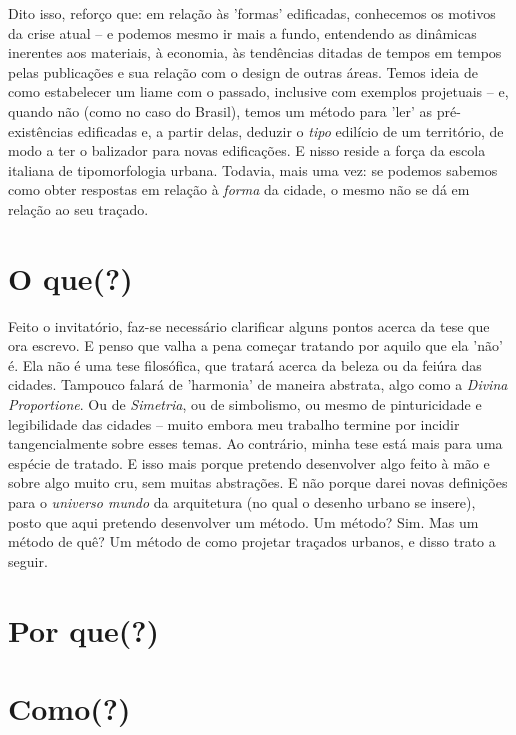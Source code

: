 \documentclass[]{report}
\begin{document}
Dito isso, reforço que: em relação às 'formas' edificadas, conhecemos os motivos da crise atual  – e podemos mesmo ir mais a fundo, entendendo as dinâmicas inerentes aos materiais, à economia, às tendências ditadas de tempos em tempos pelas publicações e sua relação com o design de outras áreas. Temos ideia de como estabelecer um liame com o passado, inclusive com exemplos projetuais – e, quando não (como no caso do Brasil), temos um método para 'ler' as pré-existências edificadas e, a partir delas, deduzir o \textit{tipo} edilício de um território, de modo a ter o balizador para novas edificações. E nisso reside a força da escola italiana de tipomorfologia urbana. Todavia, mais uma vez: se podemos sabemos como obter respostas em relação à \textit{forma} da cidade, o mesmo não se dá em relação ao seu traçado.

\section{O que(?)}

Feito o invitatório, faz-se necessário clarificar alguns pontos acerca da tese que ora escrevo. E penso que valha a pena começar tratando por aquilo que ela 'não' é. Ela não é uma tese filosófica, que tratará acerca da beleza ou da feiúra das cidades. Tampouco falará de 'harmonia' de maneira abstrata, algo como a \textit{Divina Proportione}. Ou de \textit{Simetria}, ou de simbolismo, ou mesmo de pinturicidade e legibilidade das cidades – muito embora meu trabalho termine por incidir tangencialmente sobre esses temas. Ao contrário, minha tese está mais para uma espécie de tratado. E isso mais porque pretendo desenvolver algo feito à mão e sobre algo muito cru, sem muitas abstrações. E não porque darei novas definições para o \textit{universo mundo} da arquitetura (no qual o desenho urbano se insere), posto que aqui pretendo desenvolver um método. Um método? Sim. Mas um método de quê? Um método de como projetar traçados urbanos, e disso trato a seguir.

\section{Por que(?)}

\section{Como(?)}
\end{document}
